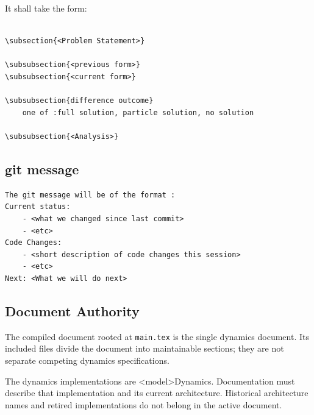 It shall take the form:
\begin{verbatim}

\subsection{<Problem Statement>}

\subsubsection{<previous form>}
\subsubsection{<current form>}

\subsubsection{difference outcome}
	one of :full solution, particle solution, no solution

\subsubsection{<Analysis>}

\end{verbatim}

\subsection{git message}

\begin{verbatim}
The git message will be of the format :
Current status:
	- <what we changed since last commit>
	- <etc>
Code Changes:
	- <short description of code changes this session>
	- <etc>
Next: <What we will do next>
\end{verbatim}

\subsection{Document Authority}

The compiled document rooted at \texttt{main.tex} is the single dynamics
document.  Its included files divide the document into maintainable sections;
they are not separate competing dynamics specifications.

The dynamics implementations are <model>Dynamics.  Documentation
must describe that implementation and its current architecture.  Historical
architecture names and retired implementations do not belong in the active
document.

